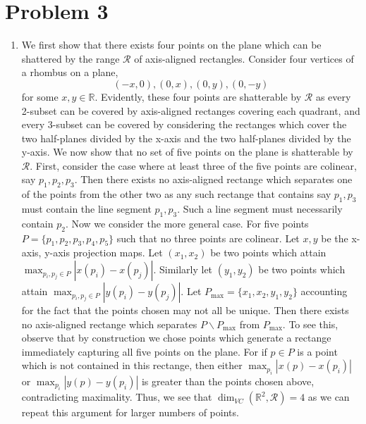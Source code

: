\documentclass[12pt]{article}%
\begin{document}
\section*{Problem 3}
\begin{enumerate}
  \item We first show that there exists four points on the plane which can be shattered by the range $\mathcal{R}$ of axis-aligned rectangles. Consider four vertices of a rhombus on a plane, $$(-x,0),(0,x), (0,y),(0,-y)$$ for some $x,y \in \mathbb{R}$. Evidently, these four points are shatterable by $\mathcal{R}$ as every 2-subset can be covered by axis-aligned rectanges covering each quadrant, and every 3-subset can be covered by considering the rectanges which cover the two half-planes divided by the x-axis and the two half-planes divided by the y-axis. \newline \newline
  We now show that no set of five points on the plane is shatterable by $\mathcal{R}$. First, consider the case where at least three of the five points are colinear, say $p_1,p_2,p_3$. Then there exists no axis-aligned rectange which separates one of the points from the other two as any such rectange that contains say $p_1,p_3$ must contain the line segment $p_1,p_3$. Such a line segment must necessarily contain $p_2$. \newline \newline
  Now we consider the more general case. For five points $P = \{p_1,p_2,p_3,p_4,p_5\}$ such that no three points are colinear. Let $x,y$ be the x-axis, y-axis projection maps. Let $(x_1,x_2)$ be two points which attain
  $\max_{p_i,p_j \in P} |x(p_i) - x(p_j)|$. Similarly let $(y_1,y_2)$ be two points which attain
  $\max_{p_i,p_j \in P} |y(p_i) - y(p_j)|$. Let $P_{\max} = \{x_1,x_2,y_1,y_2\}$ accounting for the fact that the points chosen may not all be unique. Then there exists no axis-aligned rectange which separates $P\backslash P_{\max}$ from $P_{\max}$. To see this, observe that by construction we chose points which generate a rectange immediately capturing all five points on the plane. For if $p \in P$ is a point which is not contained in this rectange, then either $\max_{p_i} |x(p) - x(p_i)|$ or  $\max_{p_i} |y(p) - y(p_i)|$ is greater than the points chosen above, contradicting maximality. \newline \newline
  Thus, we see that $\dim_{VC}(\mathbb{R}^2,\mathcal{R}) = 4$ as we can repeat this argument for larger numbers of points.


\end{enumerate}
\end{document}
